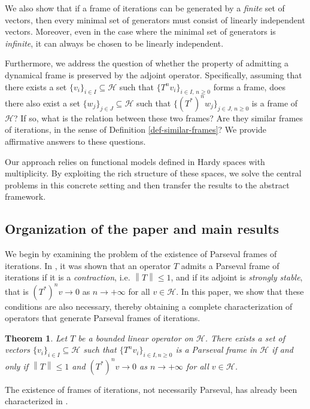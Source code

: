 \documentclass[a4paper,12pt]{amsart}
\def\HH{{\mathcal{H}}}
\newcommand{\norm}[1]{{\left\|{#1}\right\|}}
\newtheorem{theorem}{Theorem}[section]
\theoremstyle{definition}
\begin{document}
We also show that if a frame of iterations can be generated by a {\em finite} set of vectors, then every minimal set of generators must consist of linearly independent vectors. Moreover, even in the case where the minimal set of generators is {\em infinite}, it can always be chosen to be linearly independent.

Furthermore, we address the question of whether the property of admitting a dynamical frame is preserved by the  adjoint operator. Specifically, assuming that there exists a set $\{v_i\}_{i\in I}\subseteq\HH$ such that $\{T^n v_i\}_{i\in I,\,n\geqslant0}$ forms a frame, does there also exist a set
$\{w_j\}_{j\in J}\subseteq\HH$ such that $\{(T^*)^n w_j\}_{j\in J,\,n\geqslant0}$ is a frame of $\HH$?  If so, what is the relation between these two frames?  Are they similar frames of iterations, in the sense of Definition \ref{def-similar-frames}? We provide affirmative answers to these questions.

Our approach relies on functional models defined in Hardy spaces with multiplicity. By exploiting the rich structure of these spaces, we solve the central problems in this concrete setting and then transfer the results to the abstract framework.

\subsection{Organization of the paper and main results}


We begin by examining the problem of the existence of Parseval frames of iterations. In \cite{AP17}, it was shown that an operator $T$ admits a Parseval frame of iterations if it is a {\em contraction}, i.e. $\norm{T}\leqslant1$, and if its adjoint is {\em strongly stable}, that is  $(T^*)^nv\to0$ as $n\to+\infty$ for all $v\in\HH$. In this paper, we show that these conditions are also necessary, thereby obtaining a complete characterization of operators that generate Parseval frames of iterations.

\begin{theorem}\label{thm:iterationsParseval}
Let $T$ be a bounded linear operator on $\HH$. There exists a set of vectors $\{v_i\}_{i\in I}\subseteq\HH$ such that $\{T^nv_i\}_{i\in I,n\geqslant0}$ is a Parseval frame in $\HH$ if and only if $\norm{T}\leqslant1$ and $(T^*)^nv\to0$ as $n\to+\infty$ for all $v\in\HH$. 
\end{theorem}

 The existence of frames of iterations, not necessarily Parseval, has already been characterized in \cite{CMPP20}.
\end{document}
